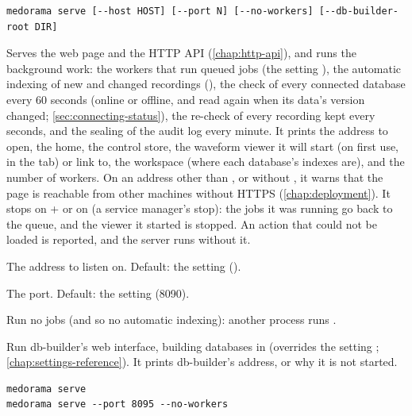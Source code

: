\begin{lstlisting}[style=signature]
medorama serve [--host HOST] [--port N] [--no-workers] [--db-builder-root DIR]
\end{lstlisting}
Serves the web page and the HTTP API (\cref{chap:http-api}), and runs the background work: the
workers that run queued jobs (the setting ), the automatic indexing of new and
changed recordings (), the check of every connected database every 60 seconds
(online or offline, and read again when its data's version changed;
\cref{sec:connecting-status}), the re-check of every recording kept every
 seconds, and the sealing of the audit log every minute. It prints the address to open, the home,
the control store, the waveform viewer it will start (on first use, in the  tab)
or link to, the workspace (where each database's indexes are), and the number of workers. On an address other
than ,  or  without , it
warns that the page is reachable from other machines without HTTPS (\cref{chap:deployment}). It
stops on + or on  (a service manager's stop): the jobs it was
running go back to the queue, and the viewer it started is stopped. An action that could not be
loaded is reported, and the server runs without it.
\begin{params}
\item[--host HOST] The address to listen on. Default: the setting 
  ().
\item[--port N] The port. Default: the setting  (8090).
\item[--no-workers] Run no jobs (and so no automatic indexing): another process runs
  .
\item[--db-builder-root DIR] Run db-builder's web interface, building databases in 
  (overrides the setting ; \cref{chap:settings-reference}). It prints
  db-builder's address, or why it is not started.
\end{params}
\begin{lstlisting}[style=shell]
medorama serve
medorama serve --port 8095 --no-workers
\end{lstlisting}

